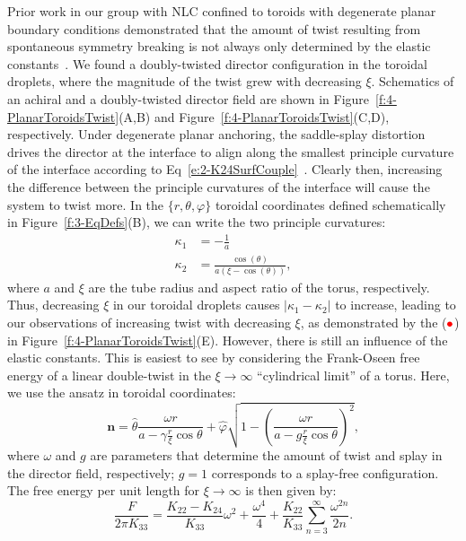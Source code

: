Prior work in our group with NLC confined to toroids with degenerate planar boundary conditions demonstrated that the amount of twist resulting from spontaneous symmetry breaking is not always only determined by the elastic constants~\cite{RN46}.
We found a doubly-twisted director configuration in the toroidal droplets, where the magnitude of the twist grew with decreasing $\xi$.
Schematics of an achiral and a doubly-twisted director field are shown in Figure~\ref{f:4-PlanarToroidsTwist}(A,B) and Figure~\ref{f:4-PlanarToroidsTwist}(C,D), respectively.
Under degenerate planar anchoring, the saddle-splay distortion drives the director at the interface to align along the smallest principle curvature of the interface according to Eq~\ref{e:2-K24SurfCouple}~\cite{RN59}.
Clearly then, increasing the difference between the principle curvatures of the interface will cause the system to twist more.
In the $\{r, \theta, \varphi\}$ toroidal coordinates defined schematically in Figure~\ref{f:3-EqDefs}(B), we can write the two principle curvatures:
\label{e:4-toursPrincipleCurv}
\begin{align}
  \kappa_1 &= -\frac{1}{a}\tag{\theequation a} \\
  \kappa_2 &= \frac{\cos(\theta)}{a(\xi-\cos(\theta))},\tag{\theequation b}
\end{align}
where $a$ and $\xi$ are the tube radius and aspect ratio of the torus, respectively.
Thus, decreasing $\xi$ in our toroidal droplets causes $|\kappa_1-\kappa_2|$ to increase, leading to our observations of increasing twist with decreasing $\xi$, as demonstrated by the (${\color{red} \bullet}$) in Figure~\ref{f:4-PlanarToroidsTwist}(E).
However, there is still an influence of the elastic constants.
This is easiest to see by considering the Frank-Oseen free energy of a linear double-twist in the $\xi \rightarrow \infty $ ``cylindrical limit'' of a torus.
Here, we use the ansatz in toroidal coordinates:
\begin{equation}\label{e:4-planransatz}
\mathbf{n} = \hat{\theta}\frac{\omega r}{a-\gamma \frac{r}{\xi} \cos \theta} + \hat{\varphi}\sqrt{1 - \left ( \frac{\omega r}{a-g \frac{r}{\xi} \cos \theta} \right )^2 },
\end{equation}
where $\omega$ and $g$ are parameters that determine the amount of twist and splay in the director field, respectively; $g=1$ corresponds to a splay-free configuration.
The free energy per unit length for $\xi \rightarrow \infty$ is then given by:
\begin{equation}\label{e:4-FEPlanarTwist}
  \frac{F}{2 \pi K_{33}} = \frac{K_{22}-K_{24}}{K_{33}}\omega^2 + \frac{\omega^4}{4} + \frac{K_{22}}{K_{33}}\sum\limits_{n=3}^{\infty} \frac{\omega^{2n}}{2n}.
\end{equation}
